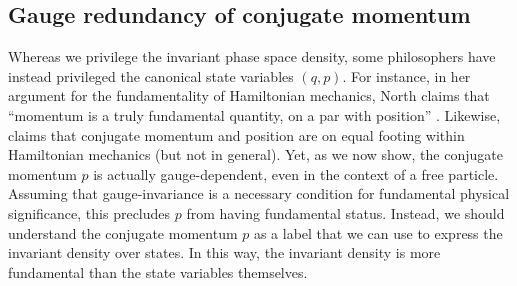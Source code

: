 \documentclass[12pt, english, twoside]{article} %
\begin{document}

\subsection{Gauge redundancy of conjugate momentum}
\label{gauge_momentum}

Whereas we privilege the invariant phase space density, some philosophers have instead privileged the canonical state variables $(q, p)$. For instance, in her argument for the fundamentality of Hamiltonian mechanics, North claims that ``momentum is a truly fundamental quantity, on a par with position'' \parencites*[77]{North}. Likewise, \textcites[164,171]{Wallace} claims that conjugate momentum and position are on equal footing within Hamiltonian mechanics (but not in general). Yet, as we now show, the conjugate momentum $p$ is actually gauge-dependent, even in the context of a free particle. Assuming that gauge-invariance is a necessary condition for fundamental physical significance, this precludes $p$ from having fundamental status. Instead, we should understand the conjugate momentum $p$ as a label that we can use to express the invariant density over states. In this way, the invariant density is more fundamental than the state variables themselves. 
\end{document}
